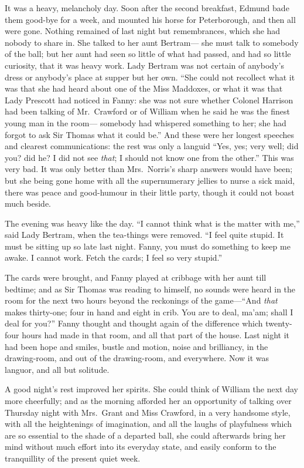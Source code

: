 It was a heavy, melancholy day.  Soon after the second
breakfast, Edmund bade them good-bye for a week, and mounted
his horse for Peterborough, and then all were gone.
Nothing remained of last night but remembrances, which she
had nobody to share in.  She talked to her aunt Bertram---%
she must talk to somebody of the ball; but her aunt had seen
so little of what had passed, and had so little curiosity,
that it was heavy work.  Lady Bertram was not certain of
anybody's dress or anybody's place at supper but her own.
``She could not recollect what it was that she had heard
about one of the Miss Maddoxes, or what it was that Lady
Prescott had noticed in Fanny:  she was not sure whether
Colonel Harrison had been talking of Mr.\ Crawford or of
William when he said he was the finest young man in the room---%
somebody had whispered something to her; she had forgot
to ask Sir Thomas what it could be.''  And these were her
longest speeches and clearest communications:  the rest
was only a languid ``Yes, yes; very well; did you? did he?
I did not see \emph{that}; I should not know one from the other.''
This was very bad.  It was only better than Mrs.\ Norris's
sharp answers would have been; but she being gone home
with all the supernumerary jellies to nurse a sick maid,
there was peace and good-humour in their little party,
though it could not boast much beside.

The evening was heavy like the day.  ``I cannot think
what is the matter with me,'' said Lady Bertram,
when the tea-things were removed.  ``I feel quite stupid.
It must be sitting up so late last night.  Fanny, you must
do something to keep me awake.  I cannot work.
Fetch the cards; I feel so very stupid.''

The cards were brought, and Fanny played at cribbage
with her aunt till bedtime; and as Sir Thomas was reading
to himself, no sounds were heard in the room for the next
two hours beyond the reckonings of the game---``And \emph{that}
makes thirty-one; four in hand and eight in crib.
You are to deal, ma'am; shall I deal for you?''  Fanny thought
and thought again of the difference which twenty-four hours
had made in that room, and all that part of the house.
Last night it had been hope and smiles, bustle and motion,
noise and brilliancy, in the drawing-room, and out of
the drawing-room, and everywhere.  Now it was languor,
and all but solitude.

A good night's rest improved her spirits.  She could think
of William the next day more cheerfully; and as the morning
afforded her an opportunity of talking over Thursday night
with Mrs.\ Grant and Miss Crawford, in a very handsome style,
with all the heightenings of imagination, and all the
laughs of playfulness which are so essential to the shade
of a departed ball, she could afterwards bring her mind
without much effort into its everyday state, and easily
conform to the tranquillity of the present quiet week.

